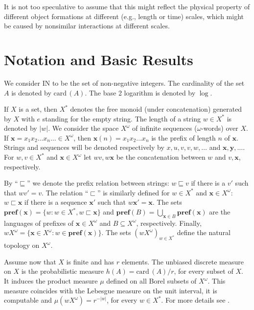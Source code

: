 \documentclass[11pt,a4paper,twoside]{article}
\def \pref#1{{\mathbf{pref}({#1})}}
\def \card {\mathrm{card}\,}
\newcommand{\x}{{\mathbf x}}
\newcommand{\y}{{\mathbf y}}
\def \bbbn {\mathrm{I\!N}} %
\begin{document}
It is not too speculative to assume that this might reflect the physical
property
of different object formations at different (e.g., length or time) scales,
which might
be caused by nonsimilar interactions at different scales.
\fi



\section{Notation and Basic Results}

We consider $\bbbn$ to be the set of non-negative integers. The
cardinality of the set $A$ is denoted by $\card(A)$.  The base 2 logarithm
is denoted by
$\log$.

If $X$ is a  set, then $X^*$ denotes the free monoid (under concatenation)
generated by $X$ with $e$ standing for the empty string. The length of a
string $w \in X^*$ is denoted by $|w|$. We consider the space $X^\omega$ of
infinite sequences ($\omega$-words)
over $X$. If $\x = x_{1}x_{2}\ldots x_{n}\ldots \in X^{\omega}$, then
$\x(n)=
x_{1}x_{2}\ldots x_{n} $ is the prefix of length $n$ of $\x$. Strings and
sequences will be denoted respectively by $x, u,v,v,w, \ldots$ and   $\x,
\y,
\ldots$. For $w, v\in X^*$ and $\x \in X^\omega$ let  $wv, w\x$ be the
concatenation between $w$ and $v, \x$, respectively.

By ``$\sqsubseteq$'' we denote the prefix relation between strings:
$w\sqsubseteq v$ if there is a $v'$ such that $w v'= v$.  The relation
``$\sqsubset$'' is similarly defined for $w\in X^{*}$ and $\x \in
X^{\omega}$:
$w\sqsubset\x$ if there is a sequence $\x'$ such that $w\x'= \x$. The sets
$\pref{\x} =\{w : w\in X^*,  w\sqsubset\x\}$ and $\pref{B}=\bigcup_{\x\in
  B}\pref{\x}$ are the languages of prefixes of $\x \in X^{\omega}$ and $B
\subseteq X^{\omega} $, respectively. Finally, $wX^{\omega} = \{\x \in
X^{\omega} : w\in\pref{\x} \}.$ The sets $(wX^{\omega})_{w\in X^*}$ define
the
natural topology on $X^{\omega}$.

Assume now that $X$ is finite and has $r$ elements. The unbiased discrete
measure on $X$ is the probabilistic measure $h (A) =
\card(A)/r$, for every subset of $X$. It induces the product measure $\mu$
defined on all Borel subsets of $X^{\omega}$. This measure coincides with
the
Lebesgue measure on the unit interval, it is computable and $\mu(w
X^{\omega})
= r^{-|w|}$, for every $w \in X^{*}$. For more details see
\cite{mar1,mar2,Ca}.
\end{document}
